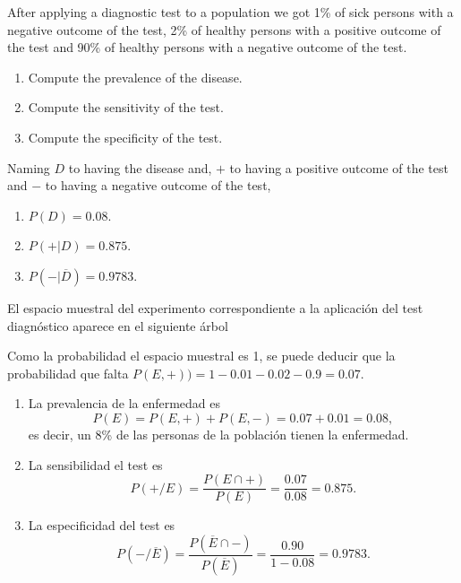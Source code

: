 {After applying a diagnostic test to a population we got 1\% of sick persons with a negative outcome of the test, 2\% of healthy persons with a positive outcome of the test and 90\% of healthy persons with a negative outcome of the test.  
\begin{enumerate}
\item Compute the prevalence of the disease.
\item Compute the sensitivity of the test.
\item Compute the specificity of the test.
\end{enumerate} 
} 
{Naming $D$ to having the disease and, $+$ to having a positive outcome of the test and $-$ to having a negative outcome of the test,
\begin{enumerate}
\item $P(D)=0.08$.
\item $P(+|D) = 0.875$.
\item $P(-|\overline{D})= 0.9783$.
\end{enumerate}
}
{El espacio muestral del experimento correspondiente a la aplicación del test diagnóstico aparece en el siguiente árbol

Como la probabilidad el espacio muestral es 1, se puede deducir que la probabilidad que falta $P(E,+))= 1- 0.01 -0.02 -0.9 = 0.07$.

\begin{enumerate}
\item La prevalencia de la enfermedad es 
\[
P(E) = P(E,+)+P(E,-) = 0.07 + 0.01 = 0.08,
\]
es decir, un 8\% de las personas de la población tienen la enfermedad.

\item La sensibilidad el test es
\[
P(+/E) = \frac{P(E\cap +)}{P(E)} = \frac{0.07}{0.08} = 0.875.
\]

\item La especificidad del test es 
\[
P(-/\overline{E}) = \frac{P(\overline E\cap -)}{P(\overline E)} = \frac{0.90}{1-0.08} = 0.9783.
\]
\end{enumerate}
}



